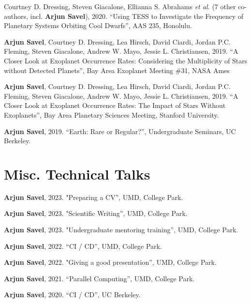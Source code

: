 \documentclass[letterpaper,10.5pt]{article}
\newcommand{\shorterSection}[1]{\vspace{-10pt}\section{#1}}
\begin{document}
\begin{list}{}{\cvlist}
\item[{\color{numcolor}\scriptsize4}] Courtney D. Dressing, Steven Giacalone, Ellianna S. Abrahams \emph{et al.} (7 other co-authors, incl. \textbf{Arjun Savel}), 2020. ``Using TESS to Investigate the Frequency of Planetary Systems Orbiting Cool Dwarfs'', AAS 235, Honolulu.


\item[{\color{numcolor}\scriptsize3}] \textbf{Arjun Savel}, Courtney D. Dressing, Lea Hirsch, David Ciardi, Jordan P.C. Fleming, Steven Giacalone, Andrew W. Mayo, Jessie L. Christiansen, 2019. “A Closer Look at Exoplanet Occurrence Rates: Considering the Multiplicity of Stars without Detected Planets”, Bay Area Exoplanet Meeting \#31, NASA Ames

\item[{\color{numcolor}\scriptsize2}] \textbf{Arjun Savel}, Courtney D. Dressing, Lea Hirsch, David Ciardi, Jordan P.C. Fleming, Steven Giacalone, Andrew W. Mayo, Jessie L. Christiansen, 2019. “A Closer Look at Exoplanet Occurrence Rates: The Impact of Stars Without Exoplanets”, Bay Area Planetary Sciences Meeting, Stanford University.

\item[{\color{numcolor}\scriptsize1}] \textbf{Arjun Savel}, 2019. “Earth: Rare or Regular?”, Undergraduate Seminars, UC Berkeley.

\end{list}

\shorterSection{Misc. Technical Talks}

\small
  \begin{list}{}{\cvlist}
\item[{\color{numcolor}\scriptsize7}] 
\textbf{Arjun Savel}, 2023. "Preparing a CV”, UMD, College Park.\item[{\color{numcolor}\scriptsize6}]
\textbf{Arjun Savel}, 2023. "Scientific Writing”, UMD, College Park.\item[{\color{numcolor}\scriptsize5}] \textbf{Arjun Savel}, 2023. "Undergraduate mentoring training”, UMD, College Park.
  \item[{\color{numcolor}\scriptsize4}] \textbf{Arjun Savel}, 2022. “CI / CD”, UMD, College Park.
  \item[{\color{numcolor}\scriptsize3}] \textbf{Arjun Savel}, 2022. "Giving a good presentation”, UMD, College Park.
  \item[{\color{numcolor}\scriptsize2}] \textbf{Arjun Savel}, 2021. “Parallel Computing”, UMD, College Park.
  \item[{\color{numcolor}\scriptsize1}] \textbf{Arjun Savel}, 2020. “CI / CD”, UC Berkeley.
  \end{list}
\end{document}
